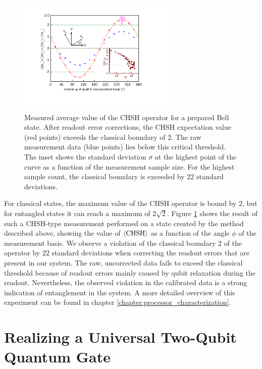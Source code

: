 %
\begin{figure}[ht!]
 \centering \includegraphics[width=0.7\textwidth]{./material/papers/iswap/submission1/Dewes_Figure3}
\caption[Measurement of the CHSH operator of an entangled two-qubit state]{Measured average value of the CHSH operator for a prepared
Bell state. After readout error corrections, the CHSH expectation
value (red points) exceeds the classical boundary of $2$. The raw
measurement data (blue points) lies below this critical threshold.
The inset shows the standard deviation $\sigma$ at the highest point
of the curve as a function of the measurement sample size. For the
highest sample count, the classical boundary is exceeded by $22$
standard deviations.}


\label{fig:chsh_measurement} %
\end{figure}


For classical states, the maximum value of the $\mathrm{CHSH}$ operator
is bound by $2$, but for entangled states it can reach a maximum of
$2\sqrt{2}$. Figure \ref{fig:chsh_measurement}
shows the result of such a $\mathrm{CHSH}$-type measurement performed
on a state created by the method described above, showing the value
of $\left< \mathrm{CHSH} \right>$ as a function of the angle $\phi$ of
the measurement basis. We observe a violation of the classical boundary $2$
of the operator by $22$ standard deviations when correcting the readout
errors that are present in our system. The raw, uncorrected data fails
to exceed the classical threshold because of readout errors mainly
caused by qubit relaxation during the readout. Nevertheless, the observed
violation in the calibrated data is a strong indication
of entanglement in the system. A more detailed overview of this experiment can be found in chapter \ref{chapter:processor_characterization}.


\section{Realizing a Universal Two-Qubit Quantum Gate}

